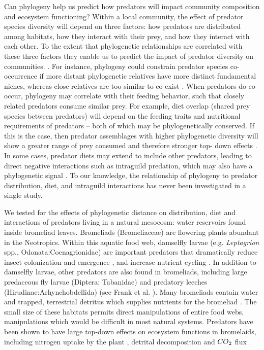 Can
phylogeny help us predict how predators will impact community composition and ecosystem functioning? Within a local community, the effect of predator species diversity will
depend on three factors: how predators are distributed among habitats,
how they interact with their prey, and how they interact with each other. To the extent that phylogenetic relationships are
correlated with these three factors they enable us to predict the impact
of predator diversity on communities. 
. For instance, phylogeny could
constrain predator species co-occurrence if more distant phylogenetic
relatives have more distinct fundamental niches, whereas close relatives
are too similar to co-exist \citep{Webb2002, Emerson2008}. When
predators do co-occur, phylogeny may correlate with their feeding
behavior, such that closely related predators consume similar prey. For
example, diet overlap (shared prey species between predators) will
depend on the feeding traits and nutritional requirements of predators
-- both of which may be phylogenetically conserved. If this is the case,
then predator assemblages with higher phylogenetic diversity will show a
greater range of prey consumed and therefore stronger top- down effects
\citep{Finke2008a}. In some cases, predator diets may extend to include
other predators, leading to direct negative interactions such as
intraguild predation, which may also have a phylogenetic signal
\citep{Pfennig2000}. To our knowledge, the relationship of phylogeny to
predator distribution, diet, and intraguild interactions has never been
investigated in a single study.

We tested for the effects of phylogenetic distance on distribution, diet
and interactions of predators living in a natural mesocosm: water
reservoirs found inside bromeliad leaves. Bromeliads (Bromeliaceae) are
flowering plants abundant in the Neotropics. Within this aquatic food
web, damselfly larvae (e.g. \emph{Leptagrion} spp.,
Odonata:Coenagrionidae) are important predators that dramatically reduce
insect colonization \citep{Hammill2015} and emergence
\citep{Starzomski2010}, and increase nutrient cycling \citep{Ngai2006}.
In addition to damselfly larvae, other predators are also found in
bromeliads, including large predaceous fly larvae (Diptera: Tabanidae)
and predatory leeches (Hirudinae:Arhynchobdellida) (see Frank et al.
\citeyearpar{Frank2009}). Many bromeliads contain water and trapped,
terrestrial detritus which supplies nutrients for the bromeliad
\citep{Reich2003a}. The small size of these habitats permits direct
manipulations of entire food webs, manipulations which would be
difficult in most natural systems. Predators have been shown to have
large top-down effects on ecosystem functions in bromelaids, including
nitrogen uptake by the plant \citep{Ngai2006}, detrital decomposition
and $CO\textsubscript{2}$ flux \citep{Atwood2014, Atwood2013}.


